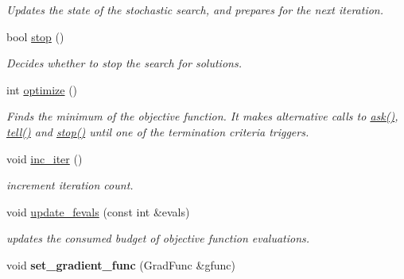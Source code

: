 \begin{DoxyCompactItemize}
\begin{DoxyCompactList}\small\item\em Updates the state of the stochastic search, and prepares for the next iteration. \end{DoxyCompactList}\item 
bool \hyperlink{classlibcmaes_1_1ESOStrategy_aa99c52d17342902cc4dc9a863deb58e3}{stop} ()
\begin{DoxyCompactList}\small\item\em Decides whether to stop the search for solutions. \end{DoxyCompactList}\item 
int \hyperlink{classlibcmaes_1_1ESOStrategy_ab50528bdfb24df59a868aeaf7a5cc1c4}{optimize} ()
\begin{DoxyCompactList}\small\item\em Finds the minimum of the objective function. It makes alternative calls to \hyperlink{classlibcmaes_1_1ESOStrategy_af614d71ca3e8353b3027723220c9e3b4}{ask()}, \hyperlink{classlibcmaes_1_1ESOStrategy_ad35926877abdaed3922b316f57723612}{tell()} and \hyperlink{classlibcmaes_1_1ESOStrategy_aa99c52d17342902cc4dc9a863deb58e3}{stop()} until one of the termination criteria triggers. \end{DoxyCompactList}\item 
\hypertarget{classlibcmaes_1_1ESOStrategy_a8eda694f97058ca603f8f31e5bb1bc05}{void \hyperlink{classlibcmaes_1_1ESOStrategy_a8eda694f97058ca603f8f31e5bb1bc05}{inc\-\_\-iter} ()}\label{classlibcmaes_1_1ESOStrategy_a8eda694f97058ca603f8f31e5bb1bc05}

\begin{DoxyCompactList}\small\item\em increment iteration count. \end{DoxyCompactList}\item 
void \hyperlink{classlibcmaes_1_1ESOStrategy_a9cfe783dc0284fce441c8757cd5222c3}{update\-\_\-fevals} (const int \&evals)
\begin{DoxyCompactList}\small\item\em updates the consumed budget of objective function evaluations. \end{DoxyCompactList}\item 
\hypertarget{classlibcmaes_1_1ESOStrategy_aecb8aeecb2053868a7d9237223067267}{void {\bfseries set\-\_\-gradient\-\_\-func} (Grad\-Func \&gfunc)}\label{classlibcmaes_1_1ESOStrategy_aecb8aeecb2053868a7d9237223067267}


\end{DoxyCompactItemize}
